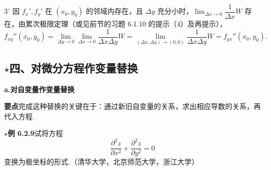\documentclass[UTF8, 12pt, fontset=fandol, oneside]{ctexart}
\begin{document}
$3^\circ$ 因 $f_x',f_y'$ 在 $(x_0,y_0)$ 的邻域内存在，且 $\Delta y$ 充分小时，$\displaystyle\lim_{\Delta x\to0}\dfrac1{\Delta x}W$ 存在，由累次极限定理（或见前节的习题 6.1.10 的提示（4）及再提示），
\[
  f_{xy}''(x_0,y_0)
  =\lim_{\Delta y\to0}\lim_{\Delta x\to0}\frac1{\Delta x\Delta y}W
  =\lim_{(\Delta x,\Delta y)\to(0,0)}\frac1{\Delta x\Delta y}W
  =f_{yx}''(x_0,y_0).
\]

\subsection*{\ensuremath{\star}四、对微分方程作变量替换}

\noindent\textbf{a.\quad 对自变量作变量替换}

\noindent\textbf{要点}\quad 完成这种替换的关键在于：通过新旧自变量的关系，求出相应导数的关系，再代入方程.

\noindent\textbf{\ensuremath{\star}例 6.2.9}\quad 试将方程
\[
  \frac{\partial^2z}{\partial x^2}+\frac{\partial^2z}{\partial y^2}=0
\]
变换为极坐标的形式.（清华大学，北京师范大学，浙江大学）
\end{document}
